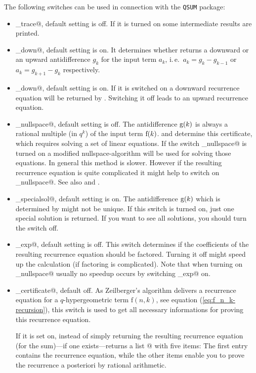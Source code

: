 The following switches can be used in connection with
the {\tt QSUM} package:
%
\begin{itemize}
	\item \verb@qsum_trace@, default setting is off. If it is
		turned on some intermediate results are printed.
	\item \verb@qgosper_down@, default setting is on. It determines
		whether \verb@qgosper@ returns a downward or an upward
		antidifference $g_k$ for the input term $a_k$,
	   i.\,e.\ $a_k=g_k-g_{k-1}$ or $a_k=g_{k+1}-g_k$ respectively.
	\item \verb@qsumrecursion_down@, default setting is on. If it is
		switched on a downward recurrence equation will be returned by
		\verb@qsumrecursion@. Switching it off leads to an upward
		recurrence equation.
	\item \verb@qsum_nullspace@, default setting is off. The 
		antidifference ${\mathrm g}(k)$ is always a rational multiple (in $q^k$)
		of the input term ${\mathrm f}(k)$. \verb@qgosper@ and \verb@qsumrecursion@
		determine this certificate, which requires solving a set of
		linear equations. If the switch \verb@qsum_nullspace@ is
		turned on a modified nullspace-algorithm will be used for
		solving those equations. In general this method is slower.
		However if the resulting recurrence equation is quite complicated
		it might help to switch on \verb@qsum_nullspace@.
		See also \cite{Knuth} and \cite{Paule1}.
	\item \verb@qgosper_specialsol@, default setting is on. The
		antidifference ${\mathrm g}(k)$ which is determined by 
		\verb@qgosper@ might not be unique. If this switch is turned on,
		just one special solution is returned. If you want
		to see all solutions, you should turn the switch off.
	\item \verb@qsumrecursion_exp@, default setting is off. This
		switch determines if the coefficients of the
		resulting recurrence equation should
		be factored. Turning it off might speed up the calculation
		(if factoring is complicated). Note that
		when turning on \verb@qsum_nullspace@ usually no speedup
		occurs by switching \verb@qsumrecursion_exp@ on.
	\item \verb@qsumrecursion_certificate@, default off. 
		As Zeilberger's algorithm 
		delivers a recurrence equation for a $q$-hypergeometric term
		$\mathrm{f}(n,k)$, see equation (\ref{eq:f_n_k-recursion}),
		this switch is used to get all necessary informations for
		proving this recurrence equation.

		If it is set on, instead of simply returning the 
		resulting recurrence equation (for the sum)---if one 
		exists---\verb@qsumrecursion@  returns 
		a list @ with
		five items: The first entry contains the
		recurrence equation, while the other items enable you to
		prove the recurrence a posteriori by rational arithmetic.


\end{itemize}
